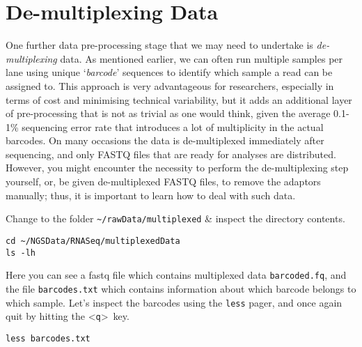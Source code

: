

\section{De-multiplexing Data}

\begin{note}
One further data pre-processing stage that we may need to undertake is \textit{de-multiplexing} data.
As mentioned earlier, we can often run multiple samples per lane using unique `\textit{barcode}' sequences to identify which sample a read can be assigned to.
This approach is very advantageous for researchers, especially in terms of cost and minimising technical variability, but it adds an additional layer of pre-processing that is not as trivial as one would think, given the average 0.1-1\% sequencing error rate that introduces a lot of multiplicity in the actual barcodes. 
On many occasions the data is de-multiplexed immediately after sequencing, and only FASTQ files that are ready for analyses are distributed. 
However, you might encounter the necessity to perform the de-multiplexing step yourself, or, be given de-multiplexed FASTQ files, to remove the adaptors manually; thus, it is important to learn how to deal with such data. \\
\end{note}

\begin{steps}
Change to the folder \texttt{\~{}/rawData/multiplexed} \& inspect the directory contents.
\begin{lstlisting}
cd ~/NGSData/RNASeq/multiplexedData
ls -lh
\end{lstlisting}
Here you can see a fastq file which contains multiplexed data \texttt{barcoded.fq}, and the file \texttt{barcodes.txt} which contains information about which barcode belongs to which sample.
Let's inspect the barcodes using the \texttt{less} pager, and once again quit by hitting the \textless \texttt{q}\textgreater ~key.
\begin{lstlisting}
less barcodes.txt
\end{lstlisting}
\end{steps}

